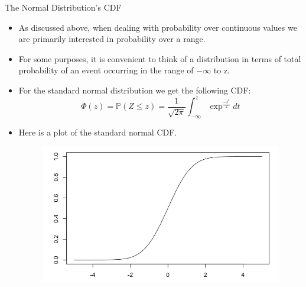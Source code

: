 \documentclass[handout]{beamer}
\begin{document}
\begin{frame}{The Normal Distribution’s CDF}

\scriptsize{
\begin{itemize}
 \item As discussed above, when dealing with probability over continuous values we are primarily interested in probability over a range.
 \item For some purposes, it is convenient to think of a distribution in terms of total probability of an event occurring in the range of $-\infty$ to z.
 \item  For the standard normal distribution we get the following CDF:
 \begin{displaymath}
  \Phi(z)= \mathbb{P}(Z \leq z) = \frac{1}{\sqrt{2\pi}}\int_{-\infty}^{z} \exp^{\frac{-t^2}{2}}dt 
 \end{displaymath}
\item Here is a plot of the standard normal CDF.

   \begin{figure}[h!]
	\centering
	\includegraphics[scale=0.25]{pics/normalcdf.png}
\end{figure}
 
 \end{itemize}

}
\end{frame}
\end{document}
